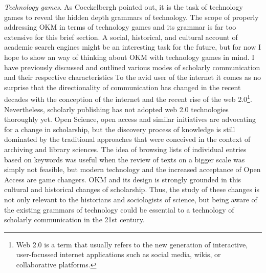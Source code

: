 \textit{Technology games}. As Coeckelbergh pointed out, it is the task of technology games to reveal the hidden depth grammars of technology. The scope of properly addressing OKM in terms of technology games and its grammar is far too extensive for this brief section. A social, historical, and cultural account of academic search engines might be an interesting task for the future, but for now I hope to show an way of thinking about OKM with technology games in mind. I have previously discussed and outlined various modes of scholarly communication and their respective characteristics To the avid user of the internet it comes as no surprise that the directionality of communication has changed in the recent decades with the conception of the internet and the recent rise of the web 2.0\footnote{Web 2.0 is a term that usually refers to the new generation of interactive, user-focussed internet applications such as social media, wikis, or collaborative platforms.}. Nevertheless, scholarly publishing has not adopted web 2.0 technologies thoroughly yet. Open Science, open access and similar initiatives are advocating for a change in scholarship, but the discovery process of knowledge is still dominated by the traditional approaches that were conceived in the context of archiving and library sciences. The idea of browsing lists of individual entries based on keywords was useful when the review of texts on a bigger scale was simply not feasible, but modern technology and the increased acceptance of Open Access are game changers. OKM and its design is strongly grounded in this cultural and historical changes of scholarship. Thus, the study of these changes is not only relevant to the historians and sociologists of science, but being aware of the existing grammars of technology could be essential to a technology of scholarly communication in the 21st century.